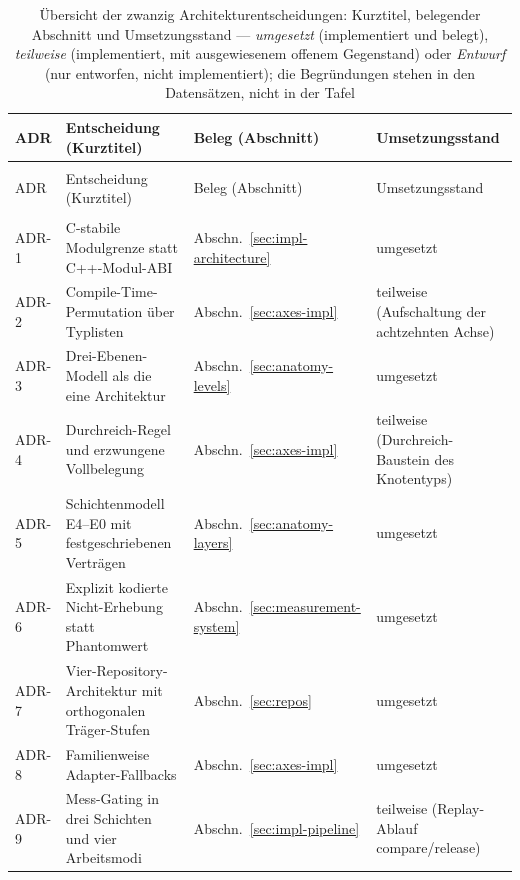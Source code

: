 \begin{footnotesize}
\begin{longtable}{@{}>{\raggedright\arraybackslash}p{1.3cm}>{\raggedright\arraybackslash}p{6.0cm}>{\raggedright\arraybackslash}p{3.3cm}>{\raggedright\arraybackslash}p{3.8cm}@{}}
\caption{Übersicht der zwanzig Architekturentscheidungen: Kurztitel, belegender Abschnitt und
Umsetzungsstand --- \emph{umgesetzt} (implementiert und belegt), \emph{teilweise} (implementiert, mit
ausgewiesenem offenem Gegenstand) oder \emph{Entwurf} (nur entworfen, nicht implementiert); die Begründungen stehen in den Datensätzen, nicht in
der Tafel}\label{tab:adr-overview}\\
\toprule
ADR & Entscheidung (Kurztitel) & Beleg (Abschnitt) & Umsetzungsstand \\
\midrule
\endfirsthead%
\multicolumn{4}{@{}l}{\tablename\ \thetable{} --- Fortsetzung}\\
\toprule
ADR & Entscheidung (Kurztitel) & Beleg (Abschnitt) & Umsetzungsstand \\
\midrule
\endhead%
\midrule
\multicolumn{4}{@{}r}{\footnotesize Fortsetzung auf der nächsten Seite}\\
\endfoot%
\bottomrule
\endlastfoot%
ADR-1 & C-stabile Modulgrenze statt C++-Modul-ABI & Abschn.~\ref{sec:impl-architecture} & umgesetzt \\
ADR-2 & Compile-Time-Permutation über Typlisten & Abschn.~\ref{sec:axes-impl} & teilweise (Aufschaltung der achtzehnten Achse) \\
ADR-3 & Drei-Ebenen-Modell als die eine Architektur & Abschn.~\ref{sec:anatomy-levels} & umgesetzt \\
ADR-4 & Durchreich-Regel und erzwungene Vollbelegung & Abschn.~\ref{sec:axes-impl} & teilweise (Durchreich-Baustein des Knotentyps) \\
ADR-5 & Schichtenmodell E4--E0 mit festgeschriebenen Verträgen & Abschn.~\ref{sec:anatomy-layers} & umgesetzt \\
ADR-6 & Explizit kodierte Nicht-Erhebung statt Phantomwert & Abschn.~\ref{sec:measurement-system} & umgesetzt \\
ADR-7 & Vier-Repository-Architektur mit orthogonalen Träger-Stufen & Abschn.~\ref{sec:repos} & umgesetzt \\
ADR-8 & Familienweise Adapter-Fallbacks & Abschn.~\ref{sec:axes-impl} & umgesetzt \\
ADR-9 & Mess-Gating in drei Schichten und vier Arbeitsmodi & Abschn.~\ref{sec:impl-pipeline} & teilweise (Replay-Ablauf compare/release) \\

\end{longtable}
\end{footnotesize}
